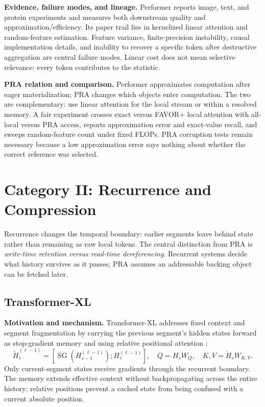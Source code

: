 \textbf{Evidence, failure modes, and lineage.} Performer reports image, text, and protein
experiments and measures both downstream quality and approximation/efficiency.  Its paper
trail lies in kernelized linear attention and random-feature estimation.  Feature variance,
finite-precision instability, causal implementation details, and inability to recover a
specific token after destructive aggregation are central failure modes.  Linear cost does
not mean selective relevance: every token contributes to the statistic.

\textbf{PRA relation and comparison.} Performer approximates computation after eager
materialization; PRA changes which objects enter computation.  The two are complementary:
use linear attention for the local stream or within a resolved memory.  A fair experiment
crosses exact versus FAVOR+ local attention with all-local versus PRA access, reports
approximation error and exact-value recall, and sweeps random-feature count under fixed
FLOPs.  PRA corruption tests remain necessary because a low approximation error says
nothing about whether the correct reference was selected.

\section{Category II: Recurrence and Compression}

Recurrence changes the temporal boundary: earlier segments leave behind state rather than
remaining as raw local tokens.  The central distinction from PRA is \emph{write-time
retention versus read-time dereferencing}.  Recurrent systems decide what history survives
as it passes; PRA assumes an addressable backing object can be fetched later.

\subsection{Transformer-XL}

\textbf{Motivation and mechanism.} Transformer-XL addresses fixed context and segment
fragmentation by carrying the previous segment's hidden states forward as stop-gradient
memory and using relative positional attention \citep{dai2019transformerxl}:
\begin{equation}
\widetilde H_{s}^{(\ell-1)}=[\operatorname{SG}(H_{s-1}^{(\ell-1)});H_s^{(\ell-1)}],
\quad Q=H_sW_Q,\quad K,V=\widetilde H_sW_{K,V}.
\end{equation}
Only current-segment states receive gradients through the recurrent boundary.  The memory
extends effective context without backpropagating across the entire history; relative
positions prevent a cached state from being confused with a current absolute position.

